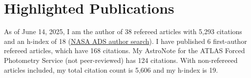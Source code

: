 \documentclass[11pt]{article} %
\begin{document}
%

\section*{Highlighted Publications}
As of June 14, 2025, I am the author of 38 refereed articles with 5,293 citations and an h-index of 18 (\href{https://ui.adsabs.harvard.edu/search/q=author%3A%22Shingles%2C%20Luke%22&sort=citation_count%20desc%2C%20bibcode%20desc&p_=0}{NASA ADS author search}). I have published 6 first-author refereed articles, which have 168 citations. My AstroNote for the ATLAS Forced Photometry Service (not peer-reviewed) has 124 citations. With non-refereeed articles included, my total citation count is 5,606 and my h-index is 19.

\begin{itemize-noindent}



\end{itemize-noindent}

\end{document}

